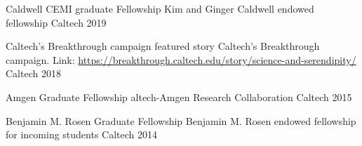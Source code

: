 


\begin{cvhonors}

  \cvhonor
    {Caldwell CEMI graduate Fellowship} %
    {Kim and Ginger Caldwell endowed fellowship} %
    {Caltech} %
    {2019} %

  \cvhonor
    {Caltech's Breakthrough campaign featured story}
    {Caltech's Breakthrough campaign. Link:
    \url{https://breakthrough.caltech.edu/story/science-and-serendipity/}} %
    {Caltech} %
    {2018} %

  \cvhonor
    {Amgen Graduate Fellowship} %
    {altech-Amgen Research Collaboration} %
    {Caltech} %
    {2015} %

  \cvhonor
    {Benjamin M. Rosen Graduate Fellowship} %
    {Benjamin M. Rosen endowed fellowship for incoming students} %
    {Caltech} %
    {2014} %

\end{cvhonors}
\pagebreak
{}
